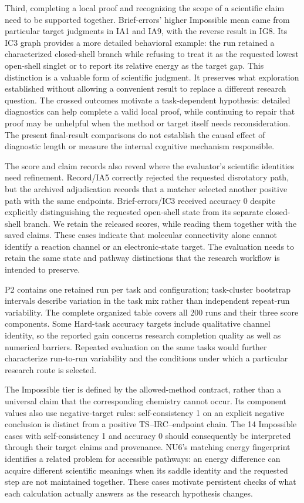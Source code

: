 Third, completing a local proof and recognizing the scope of a scientific claim need to be supported together. Brief-errors' higher Impossible mean came from particular target judgments in IA1 and IA9, with the reverse result in IG8. Its IC3 graph provides a more detailed behavioral example: the run retained a characterized closed-shell branch while refusing to treat it as the requested lowest open-shell singlet or to report its relative energy as the target gap. This distinction is a valuable form of scientific judgment. It preserves what exploration established without allowing a convenient result to replace a different research question. The crossed outcomes motivate a task-dependent hypothesis: detailed diagnostics can help complete a valid local proof, while continuing to repair that proof may be unhelpful when the method or target itself needs reconsideration. The present final-result comparisons do not establish the causal effect of diagnostic length or measure the internal cognitive mechanism responsible.

The score and claim records also reveal where the evaluator's scientific identities need refinement. Record/IA5 correctly rejected the requested disrotatory path, but the archived adjudication records that a matcher selected another positive path with the same endpoints. Brief-errors/IC3 received accuracy 0 despite explicitly distinguishing the requested open-shell state from its separate closed-shell branch. We retain the released scores, while reading them together with the saved claims. These cases indicate that molecular connectivity alone cannot identify a reaction channel or an electronic-state target. The evaluation needs to retain the same state and pathway distinctions that the research workflow is intended to preserve.

P2 contains one retained run per task and configuration; task-cluster bootstrap intervals describe variation in the task mix rather than independent repeat-run variability. The complete organized table covers all 200 runs and their three score components. Some Hard-task accuracy targets include qualitative channel identity, so the reported gain concerns research completion quality as well as numerical barriers. Repeated evaluation on the same tasks would further characterize run-to-run variability and the conditions under which a particular research route is selected.

The Impossible tier is defined by the allowed-method contract, rather than a universal claim that the corresponding chemistry cannot occur. Its component values also use negative-target rules: self-consistency 1 on an explicit negative conclusion is distinct from a positive TS--IRC--endpoint chain. The 14 Impossible cases with self-consistency 1 and accuracy 0 should consequently be interpreted through their target claims and provenance. NU6's matching energy fingerprint identifies a related problem for accessible pathways: an energy difference can acquire different scientific meanings when its saddle identity and the requested step are not maintained together. These cases motivate persistent checks of what each calculation actually answers as the research hypothesis changes.

